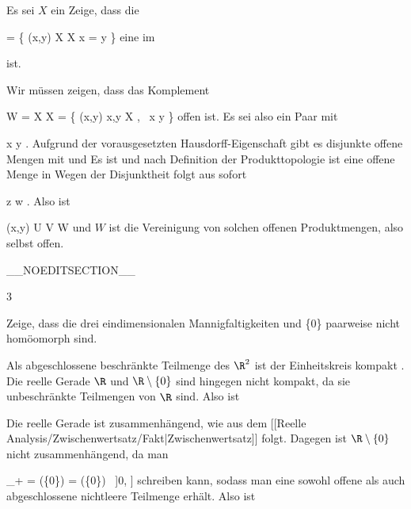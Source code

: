 {

Es sei $X$ ein
Zeige, dass die

\mavergleichskettedisp
{\vergleichskette
{ \triangle
}
{ =} { \left\{ (x,y) \in X \times X  \mid   x = y        \right\}
}
{ } {
}
{ } {
}
{ } {
}
}
{}{}{}
eine
im

 ist.

}
{

Wir müssen zeigen, dass das Komplement

\mavergleichskettedisp
{\vergleichskette
{W
}
{ =} { X \times X \setminus \triangle
}
{ =} { \left\{  (x,y)   \mid   x,y \in X , \,  x \neq y       \right\}
}
{ } {
}
{ } {
}
}
{}{}{}
offen ist. Es sei also
 ein Paar mit

\mavergleichskette
{\vergleichskette
{ x
}
{ \neq }{ y
}
{  }{
}
{    }{
}
{   }{
}
}
{}{}{.}
Aufgrund der vorausgesetzten Hausdorff-Eigenschaft gibt es disjunkte offene Mengen
 mit
 und
 Es ist
 und nach Definition der Produkttopologie ist
 eine offene Menge in
 Wegen der Disjunktheit folgt aus
 sofort

\mavergleichskette
{\vergleichskette
{z
}
{ \neq }{w
}
{  }{
}
{    }{
}
{   }{
}
}
{}{}{.}
Also ist

\mavergleichskettedisp
{\vergleichskette
{(x,y)
}
{ \in} { U \times V
}
{ \subseteq} {  W
}
{ } {
}
{ } {
}
}
{}{}{}
und $W$ ist die Vereinigung von solchen offenen Produktmengen, also selbst offen.

 }

__NOEDITSECTION__

{3}

{

Zeige, dass die drei eindimensionalen Mannigfaltigkeiten
 {} {\R} {und} {\R \setminus \{0\}} {}
paarweise nicht homöomorph sind.

}
{

Als abgeschlossene beschränkte Teilmenge des $\R^2$ ist der Einheitskreis kompakt
 {} {.} Die reelle Gerade $\R$ und $\R \setminus \{0\}$ sind hingegen nicht kompakt, da sie unbeschränkte Teilmengen von $\R$ sind. Also ist

Die reelle Gerade ist zusammenhängend, wie aus dem
[[Reelle Analysis/Zwischenwertsatz/Fakt|Zwischenwertsatz]]
folgt. Dagegen ist $\R \setminus \{0\}$ nicht zusammenhängend, da man

\mavergleichskettedisp
{\vergleichskette
{\R_+
}
{ =} {(\R \setminus \{0\}) \cap [0, \infty]
}
{ =} {(\R \setminus \{0\}) \cap \, ]0, \infty]
}
{ } {
}
{ } {
}
}
{}{}{}
schreiben kann, sodass man eine sowohl offene als auch abgeschlossene nichtleere Teilmenge erhält. Also ist

 }

